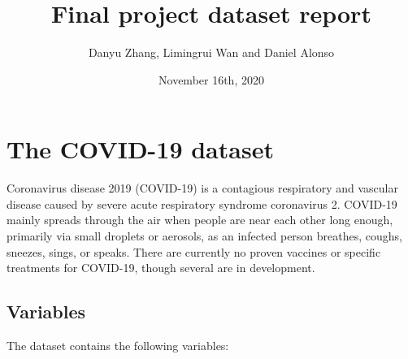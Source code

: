 \documentclass[]{article}
\title{Final project dataset report}
\author{Danyu Zhang, Limingrui Wan and Daniel Alonso}
\date{November 16th, 2020}
\begin{document}
\maketitle

\hypertarget{the-covid-19-dataset}{%
\section{\texorpdfstring{The COVID-19 dataset\\
}{The COVID-19 dataset }}\label{the-covid-19-dataset}}

Coronavirus disease 2019 (COVID-19) is a contagious respiratory and
vascular disease caused by severe acute respiratory syndrome coronavirus
2. COVID-19 mainly spreads through the air when people are near each
other long enough, primarily via small droplets or aerosols, as an
infected person breathes, coughs, sneezes, sings, or speaks. There are
currently no proven vaccines or specific treatments for COVID-19, though
several are in development.

\hypertarget{variables}{%
\subsection{Variables}\label{variables}}

The dataset contains the following variables:
\end{document}
